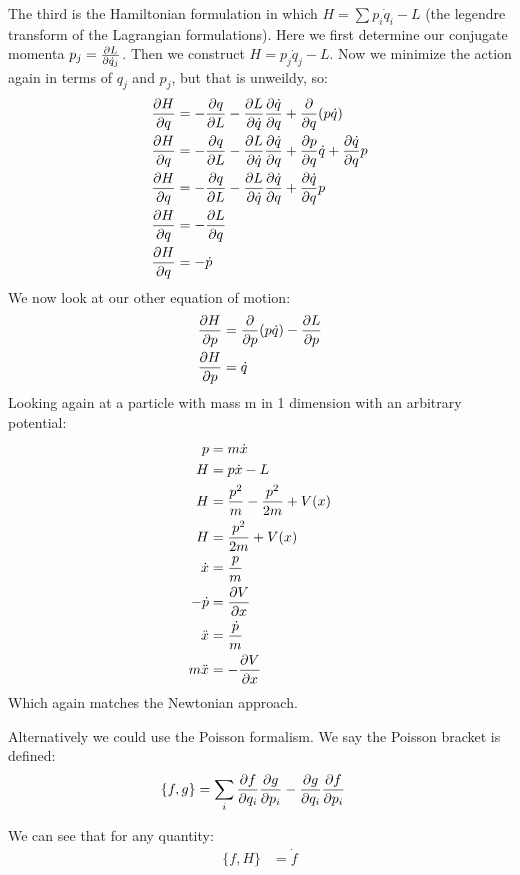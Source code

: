 The third is the Hamiltonian formulation in which $H = \sum p_i \dot{q}_i - L$ (the legendre transform of the Lagrangian formulations). Here we first determine our conjugate momenta $p_j = \frac{\partial L}{\partial \dot{q}_j}$.
Then we construct $H = p_j \dot{q}_j - L$. Now we minimize the action again in terms of $q_j$ and $p_j$, but that is unweildy, so:
\begin{align*}
	\frac{\partial H}{\partial q} &= -\frac{\partial q}{\partial L} - \frac{\partial L}{\partial \dot{q}} \frac{\partial \dot{q}}{\partial q} + \frac{\partial }{\partial q} (p \dot{q}) \\
	\frac{\partial H}{\partial q} &= -\frac{\partial q}{\partial L} - \frac{\partial L}{\partial \dot{q}} \frac{\partial \dot{q}}{\partial q} + \frac{\partial p}{\partial q} \dot{q} + \frac{\partial \dot{q}}{\partial q} p \\
	\frac{\partial H}{\partial q} &= -\frac{\partial q}{\partial L} - \frac{\partial L}{\partial \dot{q}} \frac{\partial \dot{q}}{\partial q} + \frac{\partial \dot{q}}{\partial q} p \\
	\frac{\partial H}{\partial q} &= -\frac{\partial L}{\partial q} \\
	\frac{\partial H}{\partial q} &= -\dot{p}
\end{align*}
We now look at our other equation of motion:
\begin{align*}
	\frac{\partial H}{\partial p} &= \frac{\partial }{\partial p} (p\dot{q}) - \frac{\partial L}{\partial p} \\
	\frac{\partial H}{\partial p} &= \dot{q}
\end{align*}
Looking again at a particle with mass m in 1 dimension with an arbitrary potential:
\begin{align*}
	p &= m\dot{x} \\
	H &= p\dot{x} - L \\
	H &= \frac{p^2}{m} - \frac{p^2}{2m} + V(x) \\ 
	H &= \frac{p^2}{2m}  + V(x) \\
	\dot{x} &= \frac{p}{m} \\
	-\dot{p} &= \frac{\partial V}{\partial x} \\
	\ddot{x} &= \frac{\dot{p}}{m} \\
	m\ddot{x} &= -\frac{\partial V}{\partial x}
\end{align*}
Which again matches the Newtonian approach.

Alternatively we could use the Poisson formalism. We say the Poisson bracket is defined:
\begin{align*}
	\{f,g\} &= \sum_i \frac{\partial f}{\partial q_i}\frac{\partial g}{\partial p_i} - \frac{\partial g}{\partial q_i}\frac{\partial f}{\partial p_i}
\end{align*}

We can see that for any quantity:
\begin{align*}
	\{f,H\} &= \dot{f}
\end{align*}


